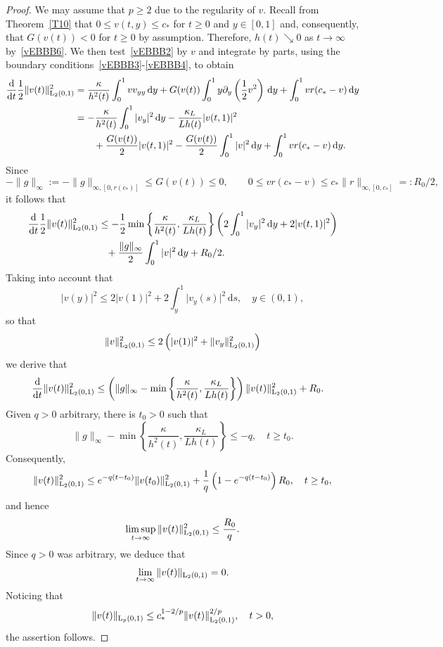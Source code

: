 \documentclass[reqno,11pt]{amsart}
\numberwithin{equation}{section}
\newcommand{\rd}{\mathrm{d}}
\begin{document}
\begin{proof}
We may assume that $p\ge 2$ due to the regularity of $v$. 
Recall from Theorem~\ref{T10} that $0\le v(t,y)\le c_*$ for $t\ge 0$
and $y\in [0,1]$ and, consequently, that $G(v(t))< 0$ for $t\ge 0$ by
assumption. Therefore, $h(t)\searrow 0$ as $t\to\infty$
by~\eqref{vEBBB6}. We then test~\eqref{vEBBB2} by $v$ and integrate by
parts, using the boundary conditions~\eqref{vEBBB3}-\eqref{vEBBB4}, to
obtain
\begin{align*}
  \frac{\rd}{\rd t} \frac{1}{2}\|v(t)\|_{{\rm L}_2(0,1)}^2&=
  \frac{\kappa}{h^2(t)}\int_0^1 vv_{yy}\,\rd y+G(v(t))\int_0^1 y
  \partial_y\left(\frac{1}{2}v^2\right)\,\rd y+ \int_0^1 v r(c_*-v)\,\rd y\\
  &=-\frac{\kappa}{h^2(t)}\int_0^1 \vert v_{y}\vert^2\,\rd y -
  \frac{\kappa_L}{Lh(t)}\vert v(t,1)\vert^2\\
  &\qquad+\frac{G(v(t))}{2}\vert v(t,1)\vert^2-\frac{G(v(t))}{2}
  \int_0^1\vert v\vert^2\,\rd y+ \int_0^1 v r(c_*-v)\,\rd y. 
\end{align*}
Since 
$$
-\|g\|_{\infty}:=-\|g\|_{\infty,[0,r(c_*)]}\le  G(v(t))\le 0, \qquad
0\le v r(c_*-v)\le c_* \|r\|_{\infty,[0,c_*]}=: R_0/2,
$$
it follows that
\begin{align*}
\frac{\rd}{\rd t} \frac{1}{2}\|v(t)\|_{{\rm L}_2(0,1)}^2&\leq
-\frac{1}{2}\min\left\{ \frac{\kappa}{h^2(t)},\frac{\kappa_L}{Lh(t)}\right\}
\left( 2\int_0^1\vert v_{y}\vert^2\,\rd y + 2\vert v(t,1)\vert^2\right)\\ 
&\phantom{\leq}+\frac{\|g\|_{\infty}}{2}\int_0^1\vert v\vert^2\,\rd y+
R_0/2 .
\end{align*}
Taking into account that
$$
\vert v(y)\vert^2\le 2\vert v(1)\vert^2+2\int_y^1\vert
v_y(s)\vert^2\,\rd s,\quad y\in (0,1),
$$
so that
$$
\|v\|_{{\rm L}_2(0,1)}^2\le 2\left(\vert
  v(1)\vert^2+\|v_y\|_{{\rm L}_2(0,1)}^2\right)
$$
we derive that
\begin{align*}
\frac{\rd}{\rd t} \|v(t)\|_{{\rm L}_2(0,1)}^2&\le 
\left(\|g\|_{\infty}-\min\left\{
\frac{\kappa}{h^2(t)},\frac{\kappa_L}{Lh(t)}\right\}\right)
\|v(t)\|_{{\rm L}_2(0,1)}^2 +R_0.  
\end{align*}
Given $q>0$ arbitrary, there is $t_0>0$ such that 
$$
\|g\|_{\infty}-\min\left\{\frac{\kappa}{h^2(t)},\frac{\kappa_L}{Lh(t)}\right\}\le 
-q,\quad t\ge t_0.
$$
Consequently,
$$
\|v(t)\|_{{\rm L}_2(0,1)}^2\le
e^{-q(t-t_0)}\|v(t_0)\|_{{\rm L} _2(0,1)}^2 +
\frac{1}{q}\left(1-e^{-q(t-t_0)}\right)R_0, \quad t\ge t_0,
$$
and hence
$$
\limsup_{t\to\infty}\|v(t)\|_{{\rm L}_2(0,1)}^2\le\frac{R_0}{q}.
$$
Since $q>0$ was arbitrary, we deduce that
$$
\lim_{t\to\infty}\|v(t)\|_{{\rm L}_2(0,1)}=0.
$$
Noticing that
$$
\|v(t)\|_{{\rm L}_p(0,1)}\le c_*^{1-2/p}
\|v(t)\|_{{\rm L}_2(0,1)}^{2/p}, \quad t>0, 
$$
the assertion follows.
\end{proof}
\end{document}
